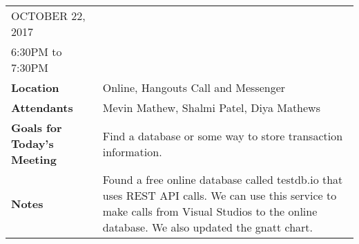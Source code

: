 \documentclass{article}
\begin{document}
\begin{table}[hp]
\begin{tabularx}{\textwidth}{lX}
\toprule
OCTOBER 22, 2017\\
6:30PM to 7:30PM\\
\midrule
\textbf{Location} & Online, Hangouts Call and Messenger\\
\textbf{Attendants} & Mevin Mathew, Shalmi Patel, Diya Mathews\\
\midrule
\textbf{Goals for Today's Meeting} & Find a database or some way to store transaction information.\\
\midrule
\textbf{Notes} & Found a free online database called testdb.io that uses REST API calls. We can use this service to make calls from Visual Studios to the online database. We also updated the gnatt chart.\\
\bottomrule
\end{tabularx}
\end{table}
\end{document}
